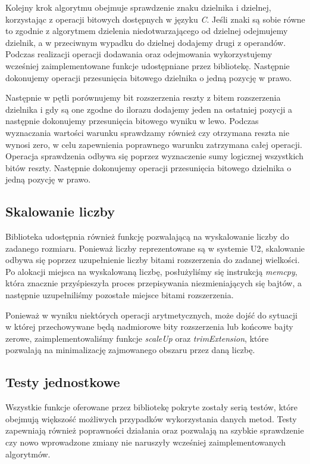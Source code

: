 \documentclass{article}
\begin{document}
Kolejny krok algorytmu obejmuje sprawdzenie znaku dzielnika i dzielnej, korzystając z operacji bitowych dostępnych w języku \textit{C}. Jeśli znaki są sobie równe to zgodnie z algorytmem dzielenia niedotwarzającego od dzielnej odejmujemy dzielnik, a w przeciwnym wypadku do dzielnej dodajemy drugi z operandów. Podczas realizacji operacji dodawania oraz odejmowania wykorzystujemy wcześniej zaimplementowane funkcje udostępniane przez bibliotekę. Następnie dokonujemy operacji przesunięcia bitowego dzielnika o jedną pozycję w prawo.

Następnie w pętli porównujemy bit rozszerzenia reszty z bitem rozszerzenia dzielnika i gdy są one zgodne do ilorazu dodajemy jeden na ostatniej pozycji a następnie dokonujemy przesunięcia bitowego wyniku w lewo. Podczas wyznaczania wartości warunku sprawdzamy również czy otrzymana reszta nie wynosi zero, w celu zapewnienia poprawnego warunku zatrzymana całej operacji. Operacja sprawdzenia odbywa się poprzez wyznaczenie sumy logicznej wszystkich bitów reszty.  Następnie dokonujemy operacji przesunięcia bitowego dzielnika o jedną pozycję w prawo.

\clearpage

\subsection{Skalowanie liczby} \label{Skalowanie liczby}

Biblioteka udostępnia również funkcję pozwalającą na wyskalowanie liczby do zadanego rozmiaru. Ponieważ liczby reprezentowane są w systemie U2, skalowanie odbywa się poprzez uzupełnienie liczby bitami rozszerzenia do zadanej wielkości. Po alokacji miejsca na wyskalowaną liczbę, posłużyliśmy się instrukcją \textit{memcpy}, która znacznie przyśpieszyła proces przepisywania niezmieniających się bajtów, a następnie uzupełniliśmy pozostałe miejsce bitami rozszerzenia.

Ponieważ w wyniku niektórych operacji arytmetycznych, może dojść do sytuacji w której przechowywane będą nadmiorowe bity rozszerzenia lub końcowe bajty zerowe, zaimplementowaliśmy funkcje \textit{scaleUp} oraz \textit{trimExtension}, które pozwalają na minimalizację zajmowanego obszaru przez daną liczbę.

\subsection{Testy jednostkowe}

Wszystkie funkcje oferowane przez bibliotekę pokryte zostały serią testów, które obejmują większość możliwych przypadków wykorzystania danych metod. Testy zapewniają również poprawności działania oraz pozwalają na szybkie sprawdzenie czy nowo wprowadzone zmiany nie naruszyły wcześniej zaimplementowanych algorytmów.
\end{document}
